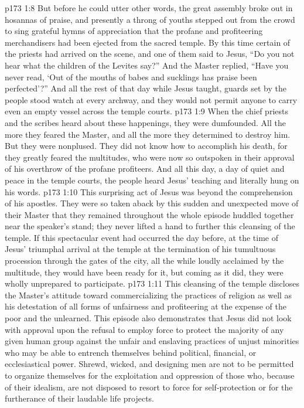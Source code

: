 \vs p173 1:8 But before he could utter other words, the great assembly broke out in hosannas of praise, and presently a throng of youths stepped out from the crowd to sing grateful hymns of appreciation that the profane and profiteering merchandisers had been ejected from the sacred temple. By this time certain of the priests had arrived on the scene, and one of them said to Jesus, “Do you not hear what the children of the Levites say?” And the Master replied, \textcolor{ubdarkred}{“Have you never read, ‘Out of the mouths of babes and sucklings has praise been perfected’?”} And all the rest of that day while Jesus taught, guards set by the people stood watch at every archway, and they would not permit anyone to carry even an empty vessel across the temple courts.
\pc \vs p173 1:9 When the chief priests and the scribes heard about these happenings, they were dumfounded. All the more they feared the Master, and all the more they determined to destroy him. But they were nonplused. They did not know how to accomplish his death, for they greatly feared the multitudes, who were now so outspoken in their approval of his overthrow of the profane profiteers. And all this day, a day of quiet and peace in the temple courts, the people heard Jesus’ teaching and literally hung on his words.
\vs p173 1:10 This surprising act of Jesus was beyond the comprehension of his apostles. They were so taken aback by this sudden and unexpected move of their Master that they remained throughout the whole episode huddled together near the speaker’s stand; they never lifted a hand to further this cleansing of the temple. If this spectacular event had occurred the day before, at the time of Jesus’ triumphal arrival at the temple at the termination of his tumultuous procession through the gates of the city, all the while loudly acclaimed by the multitude, they would have been ready for it, but coming as it did, they were wholly unprepared to participate.
\vs p173 1:11 This cleansing of the temple discloses the Master’s attitude toward commercializing the practices of religion as well as his detestation of all forms of unfairness and profiteering at the expense of the poor and the unlearned. This episode also demonstrates that Jesus did not look with approval upon the refusal to employ force to protect the majority of any given human group against the unfair and enslaving practices of unjust minorities who may be able to entrench themselves behind political, financial, or ecclesiastical power. Shrewd, wicked, and designing men are not to be permitted to organize themselves for the exploitation and oppression of those who, because of their idealism, are not disposed to resort to force for self\hyp{}protection or for the furtherance of their laudable life projects.
